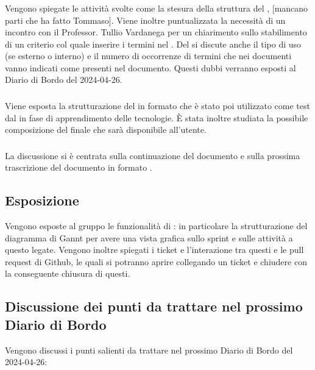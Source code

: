 \subsubsection{\Amministratore}
\par Vengono spiegate le attività svolte come la stesura della struttura del \Glossario, [mancano parti che ha fatto Tommaso]. Viene inoltre puntualizzata la necessità di un incontro con il Professor. Tullio Vardanega per un chiarimento sullo stabilimento di un criterio col quale inserire i termini nel \Glossario. Del \Glossario si discute anche il tipo di uso (se esterno o interno) e il numero di occorrenze di termini che nei documenti vanno indicati come presenti nel documento. Questi dubbi verranno esposti al Diario di Bordo del 2024-04-26.

\subsubsection{\Progettista}
\par Viene esposta la strutturazione del  in formato  che è stato poi utilizzato come test dal \Progettista in fase di apprendimento delle tecnologie. È stata inoltre studiata la possibile composizione del  finale che sarà disponibile all'utente.

\subsubsection{\Analista}
\par La discussione si è centrata sulla continuazione del documento \AnalisiDeiRequisiti e sulla prossima trascrizione del documento in formato .

\subsection{Esposizione }
\par Vengono esposte al gruppo le funzionalità di : in particolare la strutturazione del diagramma di Gannt per avere una vista grafica sullo sprint e sulle attività a questo legate. Vengono inoltre spiegati i ticket e l'interazione tra questi e le pull request di Github, le quali si potranno aprire collegando un ticket e chiudere con la conseguente chiusura di questi.

\subsection{Discussione dei punti da trattare nel prossimo Diario di Bordo}
\par Vengono discussi i punti salienti da trattare nel prossimo Diario di Bordo del 2024-04-26:
